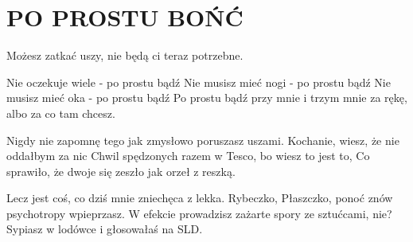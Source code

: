 \documentclass[../../../songbook.tex]{subfiles}
\begin{document}
\TabPositions{9cm} %
\section*{PO PROSTU BOŃĆ}
{}
\vspace{0.5cm}
Możesz zatkać uszy, nie będą ci teraz potrzebne.  \newline   

\-\hspace{1cm} Nie oczekuje wiele - po prostu bądź			 \newline                                                                                                                          
\-\hspace{1cm} Nie musisz mieć nogi - po prostu bądź		 \newline 	            
\-\hspace{1cm} Nie musisz mieć oka - po prostu bądź		 \newline    
\-\hspace{1cm} Po prostu bądź przy mnie i trzym mnie za rękę,	 \newline
\-\hspace{1cm} albo za co tam chcesz.				 \newline

Nigdy nie zapomnę tego jak zmysłowo poruszasz uszami.	 \newline
Kochanie, wiesz, że nie oddałbym za nic					 \newline
Chwil spędzonych razem w Tesco, bo wiesz to jest to,	 \newline
Co sprawiło, że dwoje się zeszło jak orzeł z reszką. 		 \newline

Lecz jest coś, co dziś mnie zniechęca z lekka. 				 \newline
Rybeczko, Płaszczko, ponoć znów psychotropy wpieprzasz. 				 \newline
W efekcie prowadzisz zażarte spory ze sztućcami, nie? 				 \newline
Sypiasz w lodówce i głosowałaś na SLD. 				 \newline
\end{document}
